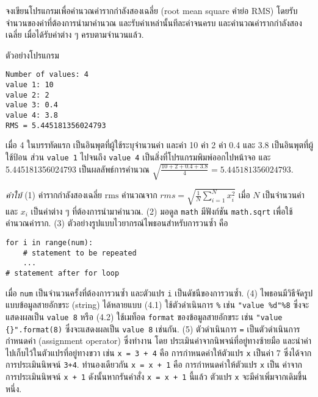 \begin{Exercise}
	\label{prog for RMS}
	จงเขียนโปรแกรมเพื่อคำนวณค่ารากกำลังสองเฉลี่ย (root mean square คำย่อ RMS) โดยรับจำนวนของค่าที่ต้องการนำมาคำนวณ และรับค่าเหล่านั้นทีละค่าจนครบ และคำนวณค่ารากกำลังสองเฉลี่ย เมื่อได้รับค่าต่าง ๆ ครบตามจำนวนแล้ว.

ตัวอย่างโปรแกรม
\begin{verbatim}
Number of values: 4
value 1: 10
value 2: 2
value 3: 0.4
value 4: 3.8
RMS = 5.445181356024793
\end{verbatim}
เมื่อ 4 ในบรรทัดแรก เป็นอินพุตที่ผู้ใช้ระบุจำนวนค่า
และค่า 10 ค่า 2 ค่า 0.4 และ 3.8 เป็นอินพุตที่ผู้ใช้ป้อน
ส่วน \verb|value 1| ไปจนถึง \verb|value 4| เป็นสิ่งที่โปรแกรมพิมพ์ออกไปหน้าจอ
และ 5.445181356024793 เป็นผลลัพธ์การคำนวณ $\sqrt{\frac{10 + 2 + 0.4 + 3.8}{4}} = 5.445181356024793$.

\textit{คำใบ้}
(1) ค่ารากกำลังสองเฉลี่ย $\mathrm{rms}$ คำนวณจาก $rms = \sqrt{\frac{1}{N} \sum_{i=1}^N x_i^2}$ เมื่อ $N$ เป็นจำนวนค่า และ $x_i$ เป็นค่าต่าง ๆ ที่ต้องการนำมาคำนวณ.
(2) มอดูล \verb|math| มีฟังก์ชัน \verb|math.sqrt| เพื่อใช้คำนวณค่าราก.
(3) ตัวอย่างรูปแบบไวยากรณ์ไพธอนสำหรับการวนซ้ำ คือ
\begin{verbatim}
for i in range(num):
    # statement to be repeated
    ...
# statement after for loop
\end{verbatim}
เมื่อ \verb|num| เป็นจำนวนครั้งที่ต้องการวนซ้ำ
และตัวแปร \verb|i| เป็นดัชนีของการวนซ้ำ.
(4) ไพธอนมีวิธีจัดรูปแบบข้อมูลสายอักขระ (string) ได้หลายแบบ 
(4.1) ใช้ตัวดำเนินการ \verb|%| เช่น
\verb|"value %d"%8| ซึ่งจะแสดงผลเป็น \verb|value 8|
หรือ (4.2) ใช้เมท็อด \verb|format| ของข้อมูลสายอักขระ เช่น
\verb|"value {}".format(8)| ซึ่งจะแสดงผลเป็น \verb|value 8| เช่นกัน.
(5) ตัวดำเนินการ \verb|=| เป็นตัวดำเนินการกำหนดค่า (assignment operator)
ซึ่งทำงาน โดย ประเมินค่าจากนิพจน์ที่อยู่ทางซ้ายมือ และนำค่าไปเก็บไว้ในตัวแปรที่อยู่ทางขวา เช่น
\verb|x = 3 + 4| คือ การกำหนดค่าให้ตัวแปร \verb|x| เป็นค่า 7 ซึ่งได้จากการประเมินนิพจน์ \verb|3+4|.
ทำนองเดียวกัน
\verb|x = x + 1| คือ การกำหนดค่าให้ตัวแปร \verb|x| เป็น 
ค่าจากการประเมินนิพจน์ \verb|x + 1|
ดังนั้นหากรันคำสั่ง \verb|x = x + 1| นี้แล้ว ตัวแปร \verb|x| จะมีค่าเพิ่มจากเดิมขึ้นหนึ่ง.


\end{Exercise}

